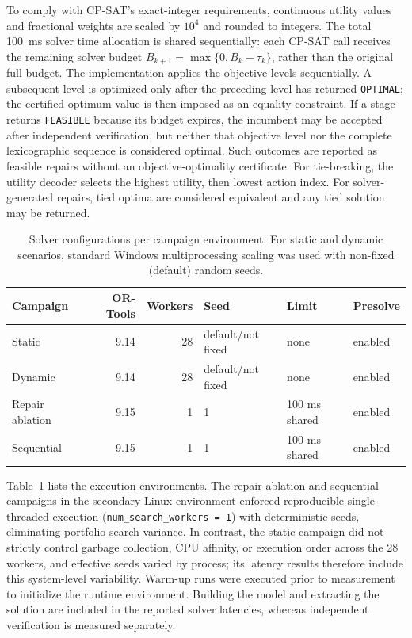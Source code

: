 \documentclass[pdflatex,sn-mathphys-num,iicol,oneside]{sn-jnl}
\newcommand{\cpsat}{\textsc{CP-SAT}\xspace}
\begin{document}
To comply with \cpsat's exact-integer requirements, continuous utility values and fractional weights are scaled by $10^4$ and rounded to integers. The total 100~ms solver time allocation is shared sequentially: each CP-SAT call receives the remaining solver budget $B_{k+1}=\max\{0,B_k-\tau_k\}$, rather than the original full budget. The implementation applies the objective levels sequentially. A subsequent level is optimized only after the preceding level has returned \texttt{OPTIMAL}; the certified optimum value is then imposed as an equality constraint. If a stage returns \texttt{FEASIBLE} because its budget expires, the incumbent may be accepted after independent verification, but neither that objective level nor the complete lexicographic sequence is considered optimal. Such outcomes are reported as feasible repairs without an objective-optimality certificate. For tie-breaking, the utility decoder selects the highest utility, then lowest action index. For solver-generated repairs, tied optima are considered equivalent and any tied solution may be returned.

\begin{table}[t]
\centering
\caption{Solver configurations per campaign environment. For static and dynamic scenarios, standard Windows multiprocessing scaling was used with non-fixed (default) random seeds.}
\label{tab:solver-config}
\setlength{\tabcolsep}{4pt}
\small
\begin{tabular}{lrrlll}
\toprule
Campaign & OR-Tools & Workers & Seed & Limit & Presolve \\
\midrule
Static & 9.14 & 28 & default/not fixed & none & enabled \\
Dynamic & 9.14 & 28 & default/not fixed & none & enabled \\
Repair ablation & 9.15 & 1 & 1 & 100 ms shared & enabled \\
Sequential & 9.15 & 1 & 1 & 100 ms shared & enabled \\
\bottomrule
\end{tabular}
\end{table}

Table~\ref{tab:solver-config} lists the execution environments. The repair-ablation and sequential campaigns in the secondary Linux environment enforced reproducible single-threaded execution (\texttt{num\_search\_workers = 1}) with deterministic seeds, eliminating portfolio-search variance. In contrast, the static campaign did not strictly control garbage collection, CPU affinity, or execution order across the 28 workers, and effective seeds varied by process; its latency results therefore include this system-level variability. Warm-up runs were executed prior to measurement to initialize the runtime environment. Building the model and extracting the solution are included in the reported solver latencies, whereas independent verification is measured separately.
\end{document}
